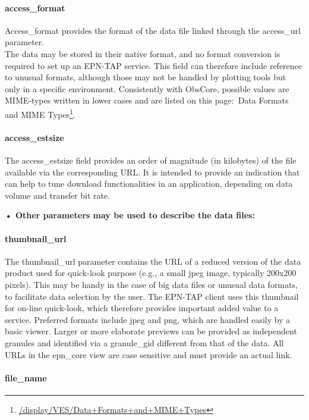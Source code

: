 \documentclass[11pt,a4paper]{ivoa}
\begin{document}
\paragraph{access\_format}

Access\_format provides the format of the data file linked through the access\_url parameter. \\The data may be stored in their native format, and no format conversion is required to set up an EPN-TAP service. This field can therefore include reference to unusual formats, although those may not be handled by plotting tools but only in a specific environment. Consistently with ObsCore, possible values are MIME-types written in lower cases and are listed on this page: Data Formats and MIME Types\footnote{\url{/display/VES/Data+Formats+and+MIME+Types}}.

\paragraph{access\_estsize}

The access\_estsize field provides an order of magnitude (in kilobytes) of the file available via the corresponding URL. It is intended to provide an indication that can help to tune download functionalities in an application, depending on data volume and transfer bit rate.

\textbf{• Other parameters may be used to describe the data files:}

\paragraph{thumbnail\_url}

The thumbnail\_url parameter contains the URL of a reduced version of the data product used for quick-look purpose (e.g., a small jpeg image, typically 200x200 pixels). This may be handy in the case of big data files or unusual data formats, to facilitate data selection by the user. The EPN-TAP client uses this thumbnail for on-line quick-look, which therefore provides important added value to a service. Preferred formats include jpeg and png, which are handled easily by a basic viewer. Larger or more elaborate previews can be provided as independent granules and identified via a granule\_gid different from that of the data. All URLs in the epn\_core view are case sensitive and must provide an actual link.

\paragraph{file\_name}
\end{document}
